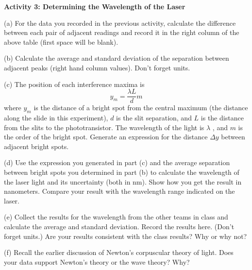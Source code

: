 \textbf{Activity 3: Determining the Wavelength of the Laser }

(a) For the data you recorded in the previous activity, calculate the 
difference between each pair of adjacent readings and record it in the 
right column of the above table (first space will be blank).

(b) Calculate the average and standard deviation of the separation between 
adjacent peaks (right hand column values). Don't forget units.
\vspace{15mm}

(c) The position of each interference maxima is
$$
y_{m}=\frac{\lambda L}{d}m
$$
where $y_{m}$ is the distance of a bright spot from the central
maximum (the distance along the slide in this experiment),
$d$ is the slit separation, and $L$ is
the distance from the slits to the phototransistor. 
The wavelength of the light is \( \lambda  \) ,
and $m$ is the order of the bright spot. 
Generate an expression for
the distance $\Delta y$ between adjacent bright spots.
\vspace{20mm}

(d) Use the expression you generated in part (c) and the average separation
between bright spots you determined in part (b) to calculate the wavelength of 
the laser light and its uncertainty (both in nm). Show how you get the result 
in nanometers. Compare your result with the wavelength range indicated on the 
laser.
\vspace{30mm}

(e) Collect the results for the wavelength from the other teams in class
and calculate the average and standard deviation. Record the results here. 
(Don't forget units.)
Are your results consistent with the class results? Why or why not?
\vspace{15mm}

(f) Recall the earlier discussion of Newton's corpuscular theory of
light. Does your data support Newton's theory or the wave theory?
Why?\vspace{15mm}

